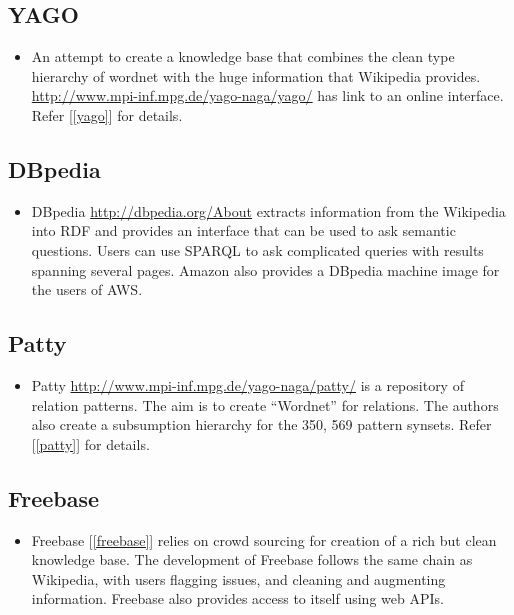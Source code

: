 \subsection{YAGO}
\begin{itemize}
 \item An attempt to create a knowledge base that combines the clean type hierarchy of 
 wordnet with the huge information that Wikipedia provides. \url{http://www.mpi-inf.mpg.de/yago-naga/yago/}
 has link to an online interface. Refer [\ref{yago}] for details. 
\end{itemize}

 \subsection{DBpedia}
 \begin{itemize}
  \item DBpedia \url{http://dbpedia.org/About} extracts information from the Wikipedia into RDF and provides 
  an interface that can be used to ask semantic questions. Users can use SPARQL to ask complicated queries 
  with results spanning several pages. Amazon also provides a DBpedia machine image for the users of AWS.
 \end{itemize}

 \subsection{Patty}
 \begin{itemize}
  \item  Patty \url{http://www.mpi-inf.mpg.de/yago-naga/patty/} is a repository of relation patterns. The aim is to 
  create ``Wordnet'' for relations. The authors also create a subsumption hierarchy for the 350, 569 pattern synsets.
  Refer [\ref{patty}] for details.  
 \end{itemize}

\subsection{Freebase}
 \begin{itemize}
\item Freebase [\ref{freebase}] relies on crowd sourcing for creation of a rich but clean knowledge base.
The development of Freebase follows the same chain as Wikipedia, with users flagging issues, and
cleaning and augmenting information. Freebase also provides access to itself using web APIs.
\end{itemize}

